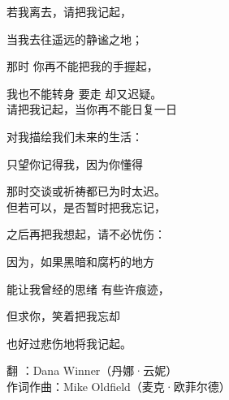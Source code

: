  {若我离去，请把我记起，
 	
  当我去往遥远的静谧之地；
  
  那时  你再不能把我的手握起，
  
  我也不能转身  要走  却又迟疑。\\
  


请把我记起，当你再不能日复一日

对我描绘我们未来的生活：

只望你记得我，因为你懂得

那时交谈或祈祷都已为时太迟。\\


但若可以，是否暂时把我忘记，

之后再把我想起，请不必忧伤：

因为，如果黑暗和腐朽的地方

能让我曾经的思绪 有些许痕迹，

但求你，笑着把我忘却

也好过悲伤地将我记起。

}
{
翻		：Dana Winner（丹娜·云妮）\\
作词作曲：Mike Oldfield（麦克·欧菲尔德）
}
